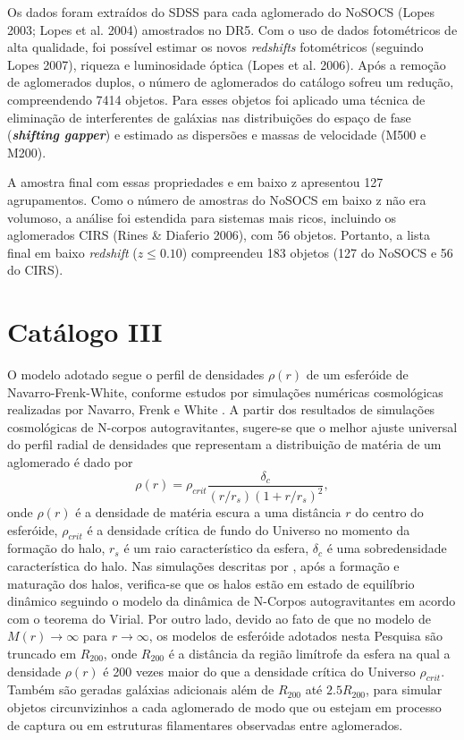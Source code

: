 Os dados foram extraídos do SDSS para cada aglomerado do NoSOCS (Lopes 2003; Lopes et al. 2004) amostrados no DR5. Com o uso de dados fotométricos de alta qualidade, foi possível estimar os novos \textit{redshifts} fotométricos (seguindo Lopes 2007), riqueza e luminosidade óptica (Lopes et al. 2006). Após a remoção de aglomerados duplos, o número de aglomerados do catálogo sofreu um redução, compreendendo 7414 objetos. Para esses objetos foi aplicado uma técnica de eliminação de interferentes de galáxias nas distribuições do espaço de fase (\textit{\textbf{shifting gapper}}) e estimado as dispersões e massas de velocidade (M500 e M200). 

A amostra final com essas propriedades e em baixo z apresentou 127 agrupamentos. Como o número de amostras do NoSOCS em baixo z não era volumoso, a análise foi estendida para sistemas mais ricos, incluindo os aglomerados CIRS (Rines \& Diaferio 2006), com 56 objetos. Portanto, a lista final em baixo \textit{redshift} ($z \leq 0.10$) compreendeu 183 objetos (127 do NoSOCS e 56 do CIRS). 

\section{Catálogo III}
O modelo adotado segue o perfil de densidades $\rho(r)$ de um esferóide de Navarro-Frenk-White, conforme estudos por simulações numéricas cosmológicas realizadas por Navarro, Frenk e White \cite{NFW1997}. A partir dos resultados de simulações cosmológicas de N-corpos autogravitantes, sugere-se que o melhor ajuste universal do perfil radial de densidades que representam a distribuição de matéria de um aglomerado é dado por
\begin{equation}
\rho(r)=\rho_{crit}\frac{\delta_c}{(r/r_s)(1 + r/r_s)^2},
\label{nfw1}
\end{equation}
onde $\rho(r)$ é a densidade de matéria escura a uma distância $r$ do centro do esferóide, $\rho_{crit}$ é a densidade crítica de fundo do Universo no momento da formação do halo, $r_s$ é um raio característico da esfera, $\delta_c$ é uma sobredensidade característica do halo. Nas simulações descritas por , após a formação e maturação dos halos, verifica-se que os halos estão em estado de equilíbrio dinâmico seguindo o modelo da dinâmica de N-Corpos autogravitantes em acordo com o teorema do Virial. Por outro lado, devido ao fato de que no modelo de  $M(r) \to \infty$ para $r \to \infty$, os modelos de esferóide adotados nesta Pesquisa são truncado em $R_{200}$, onde $R_{200}$ é a distância da região limítrofe da esfera na qual a densidade $\rho(r)$ é 200 vezes maior do que a densidade crítica do Universo $\rho_{crit}$. Também são geradas galáxias adicionais além de $R_{200}$ at\'e $2.5 R_{200}$, para simular objetos circunvizinhos a cada aglomerado de modo que ou estejam em processo de captura ou em estruturas filamentares observadas entre aglomerados.

